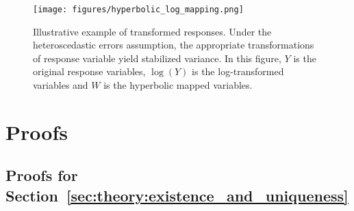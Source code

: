 \begin{figure}[H]
    \centering
    \texttt{[image: figures/hyperbolic\_log\_mapping.png]}
    \caption{Illustrative example of transformed responses.
    Under the heteroscedastic errors assumption, the appropriate transformations of response variable yield stabilized variance.
    In this figure, $Y$ is the original response variables, $\log(Y)$ is the log-transformed variables and $W$ is the hyperbolic mapped variables.}
    \label{fig:hyperbolic_log_mapping}
\end{figure}

\clearpage

\section{Proofs}
\label{apd:proofs}

\subsection{Proofs for Section~\ref{sec:theory:existence_and_uniqueness}}

